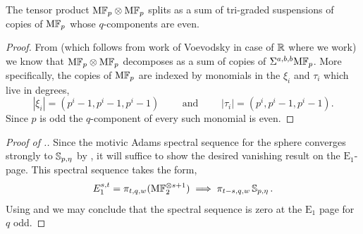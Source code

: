 \begin{lem}\label{lem:odd-dual-enough}
  The tensor product $\mathrm{M}\mathbb{F}_p \otimes \mathrm{M}\mathbb{F}_p$ splits as a sum of tri-graded suspensions of copies of $\mathrm{M}\mathbb{F}_p$ whose $q$-components are even.
\end{lem}

\begin{proof}
  From \cite[Theorem 1.1 (3)]{HoyoisSteenrod} (which follows from work of Voevodsky \cite{Voe03, Voe10} in case of $\mathbb{R}$ where we work) we know that $\mathrm{M}\mathbb{F}_p \otimes \mathrm{M}\mathbb{F}_p$ decomposes as a sum of copies of $\Sigma^{a,b,b} \mathrm{M}\mathbb{F}_p $. More specifically, the copies of $\mathrm{M}\mathbb{F}_p$ are indexed by monomials in the $\xi_i$ and $\tau_i$ which live in degrees,
  \[ |\xi_i| = (p^i - 1, p^i - 1, p^i - 1) \qquad \text{ and } \qquad |\tau_i| = (p^i, p^i - 1, p^i - 1). \]
  Since $p$ is odd the $q$-component of every such monomial is even.
\end{proof}

\begin{proof}[Proof of .]
  Since the motivic Adams spectral sequence for the sphere converges strongly to $\operatorname{\mathbb{S}}_{p,\eta}$ by \cite{MAdamsConv},
  it will suffice to show the desired vanishing result on the $\mathrm{E}_1$-page.  
  This spectral sequence takes the form,
  \[ E_1^{s,t} = \pi_{t,q,w}(\mathrm{M}\mathbb{F}_2^{\otimes {s+1}}) \implies \pi_{t-s,q,w} \operatorname{\mathbb{S}}_{p,\eta}. \]
  Using  and  we may conclude that the spectral sequence is zero at the $\mathrm{E}_1$ page for $q$ odd.
\end{proof}
      
